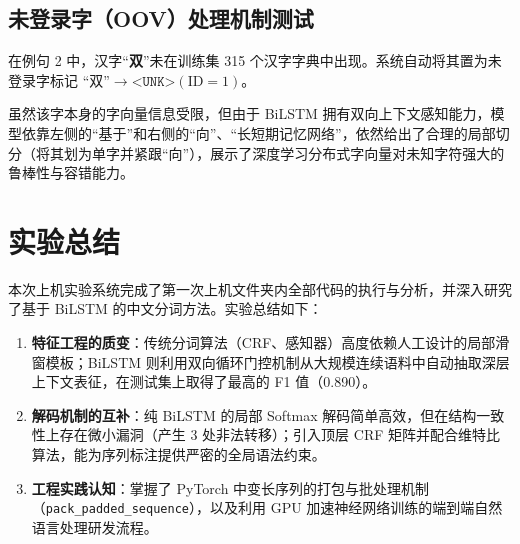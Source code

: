 \documentclass[11pt,a4paper]{ctexart}
\begin{document}
\subsection{未登录字（OOV）处理机制测试}

在例句 2 中，汉字“\textbf{双}”未在训练集 315 个汉字字典中出现。系统自动将其置为未登录字标记 $\text{“双”} \to \texttt{<UNK>} (\text{ID}=1)$。

虽然该字本身的字向量信息受限，但由于 BiLSTM 拥有双向上下文感知能力，模型依靠左侧的“基于”和右侧的“向”、“长短期记忆网络”，依然给出了合理的局部切分（将其划为单字并紧跟“向”），展示了深度学习分布式字向量对未知字符强大的鲁棒性与容错能力。

\section{实验总结}

本次上机实验系统完成了第一次上机文件夹内全部代码的执行与分析，并深入研究了基于 BiLSTM 的中文分词方法。实验总结如下：
\begin{enumerate}
    \setlength{\itemsep}{1pt}
    \item \textbf{特征工程的质变}：传统分词算法（CRF、感知器）高度依赖人工设计的局部滑窗模板；BiLSTM 则利用双向循环门控机制从大规模连续语料中自动抽取深层上下文表征，在测试集上取得了最高的 F1 值（0.890）。
    \item \textbf{解码机制的互补}：纯 BiLSTM 的局部 Softmax 解码简单高效，但在结构一致性上存在微小漏洞（产生 3 处非法转移）；引入顶层 CRF 矩阵并配合维特比算法，能为序列标注提供严密的全局语法约束。
    \item \textbf{工程实践认知}：掌握了 PyTorch 中变长序列的打包与批处理机制（\texttt{pack\_padded\_sequence}），以及利用 GPU 加速神经网络训练的端到端自然语言处理研发流程。
\end{enumerate}
\end{document}
